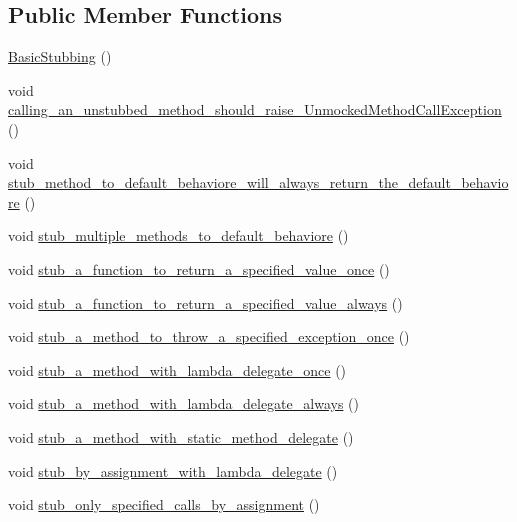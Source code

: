 \subsection*{Public Member Functions}
\begin{DoxyCompactItemize}
\item 
\mbox{\hyperlink{structBasicStubbing_a594b804ddcd4245e6c5cfbd2438cc970}{Basic\+Stubbing}} ()
\item 
void \mbox{\hyperlink{structBasicStubbing_ab3bd336450497a8b4824149632a1ca13}{calling\+\_\+an\+\_\+unstubbed\+\_\+method\+\_\+should\+\_\+raise\+\_\+\+Unmocked\+Method\+Call\+Exception}} ()
\item 
void \mbox{\hyperlink{structBasicStubbing_aa8f3958ff373a5eecf9577eeda210b77}{stub\+\_\+method\+\_\+to\+\_\+default\+\_\+behaviore\+\_\+will\+\_\+always\+\_\+return\+\_\+the\+\_\+default\+\_\+behaviore}} ()
\item 
void \mbox{\hyperlink{structBasicStubbing_a6d9fbfb1ff333fb6424bc633e12f04c8}{stub\+\_\+multiple\+\_\+methods\+\_\+to\+\_\+default\+\_\+behaviore}} ()
\item 
void \mbox{\hyperlink{structBasicStubbing_a6f1b35aa5bac346e96926fdb59a063df}{stub\+\_\+a\+\_\+function\+\_\+to\+\_\+return\+\_\+a\+\_\+specified\+\_\+value\+\_\+once}} ()
\item 
void \mbox{\hyperlink{structBasicStubbing_a778e17864de6512fd662270161008ecc}{stub\+\_\+a\+\_\+function\+\_\+to\+\_\+return\+\_\+a\+\_\+specified\+\_\+value\+\_\+always}} ()
\item 
void \mbox{\hyperlink{structBasicStubbing_abb595a0b86e867bb251977849b9261f1}{stub\+\_\+a\+\_\+method\+\_\+to\+\_\+throw\+\_\+a\+\_\+specified\+\_\+exception\+\_\+once}} ()
\item 
void \mbox{\hyperlink{structBasicStubbing_aed48703d5d8b140e1d5c815647031102}{stub\+\_\+a\+\_\+method\+\_\+with\+\_\+lambda\+\_\+delegate\+\_\+once}} ()
\item 
void \mbox{\hyperlink{structBasicStubbing_a97bcfabd427f34fc7e146dc98e78f1de}{stub\+\_\+a\+\_\+method\+\_\+with\+\_\+lambda\+\_\+delegate\+\_\+always}} ()
\item 
void \mbox{\hyperlink{structBasicStubbing_a32622c80a25b563de8c3b53de4f2b1b4}{stub\+\_\+a\+\_\+method\+\_\+with\+\_\+static\+\_\+method\+\_\+delegate}} ()
\item 
void \mbox{\hyperlink{structBasicStubbing_a38c865bfadd8777326fbe42a9abad036}{stub\+\_\+by\+\_\+assignment\+\_\+with\+\_\+lambda\+\_\+delegate}} ()
\item 
void \mbox{\hyperlink{structBasicStubbing_abd0cea73c06cd62497799113d5729339}{stub\+\_\+only\+\_\+specified\+\_\+calls\+\_\+by\+\_\+assignment}} ()

\end{DoxyCompactItemize}
